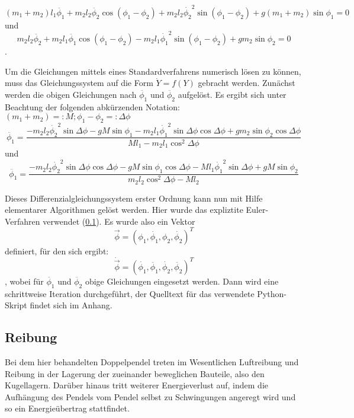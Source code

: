 \begin{equation}
(m_1 + m_2) l_1 \ddot{\phi_1}  + m_2 l_2 \ddot{\phi_2} \cos{(\phi_1 - \phi_2)} + m_2 l_2 \dot{\phi_2}^{2} \sin{(\phi_1 - \phi_2)} + g (m_1 + m_2) \sin{\phi_1} = 0
\end{equation} 
und
\begin{equation}
m_2 l_2 \ddot{\phi_2} + m_2 l_1 \ddot{\phi_1} \cos{(\phi_1 - \phi_2)} - m_2 l_1 \dot{\phi_1}^{2} \sin{(\phi_1 - \phi_2)} + g m_2 \sin{\phi_2} = 0
\end{equation}
. 

Um die Gleichungen mittels eines Standardverfahrens numerisch lösen zu können, muss das Gleichungssystem auf die Form $ \dot{Y} = f(Y) $ gebracht werden. Zunächst werden die obigen Gleichungen nach $ \ddot{\phi_1} $ und $ \ddot{\phi_2} $ aufgelöst. Es ergibt sich unter Beachtung der folgenden abkürzenden Notation: 
$ (m_1 + m_2) =: M; \phi_1 - \phi_2 =: \Delta \phi $
\begin{equation}
\ddot{\phi_1} = \frac{-m_2 l_2 \dot{\phi_2}^{2} \sin{\Delta \phi} - g M \sin{\phi_1} - m_2 l_1 \dot{\phi_1}^{2} \sin{\Delta \phi} \cos{\Delta \phi} + g m_2 \sin{\phi_2}\cos{\Delta  \phi}}{M l_1 - m_2 l_1 \cos^{2}{\Delta \phi}}
\end{equation}
und
\begin{equation} 
\ddot{\phi_1} = \frac{-m_2 l_2 \dot{\phi_2}^{2} \sin{\Delta \phi} \cos{\Delta \phi} - g M \sin{\phi_1} \cos{\Delta \phi} - M l_1 \dot{\phi_1}^{2} \sin{\Delta \phi} + g M \sin{\phi_2}}{m_2 l_2 \cos^{2}{\Delta \phi} - M l_2}
\end{equation}

Dieses Differenzialgleichungssystem erster Ordnung kann nun mit Hilfe elementarer Algorithmen gelöst werden. Hier wurde das expliztite Euler-Verfahren verwendet (\ref{}). Es wurde also ein Vektor $$ \vec{\phi} = (
\phi_1, \dot{\phi_1}, \phi_2 , \dot{\phi_2})^{T} $$ 
 definiert, für den sich ergibt: 
\begin{equation}
\dot{\vec{\phi}} = (\dot{\phi_1}, \ddot{\phi_1}, \dot{\phi_2}, \ddot{\phi_2})^{T}
\end{equation}
, wobei für $ \ddot{\phi_1} $ und $ \ddot{\phi_2} $ obige Gleichungen eingesetzt werden. 
Dann wird eine schrittweise Iteration durchgeführt, der Quelltext für das verwendete Python-Skript findet sich im Anhang. 

\subsection{Reibung}
Bei dem hier behandelten Doppelpendel treten im Wesentlichen Luftreibung und Reibung in der Lagerung der zueinander beweglichen Bauteile, also den Kugellagern. Darüber hinaus tritt weiterer Energieverlust auf, indem die Aufhängung des Pendels vom Pendel selbst zu Schwingungen angeregt wird und so ein Energieübertrag stattfindet. 


